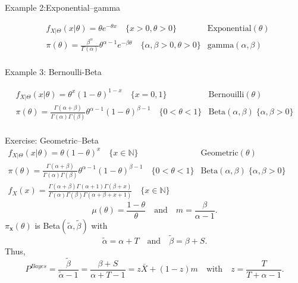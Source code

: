 \documentclass[11pt]{beamer}
\begin{document}
\begin{frame}{Example 2:Exponential--gamma}
\vspace{-3 cm}

\begin{align*}
&f_{X|\Theta}(x|\theta)=\theta e^{-\theta x} \quad\{x>0, \theta>0\} & \text{Exponential}(\theta) \\
&\pi(\theta)=\frac{\beta^\alpha}{\Gamma(\alpha)}\theta^{\alpha-1}e^{-\beta \theta} \quad\{\alpha,\beta>0,\theta>0\}& \text{gamma}(\alpha,\beta) \\
\end{align*}


\end{frame}
\begin{frame}

\end{frame}
\begin{frame}

\end{frame}
\begin{frame}{Example 3: Bernoulli-Beta}
\vspace{-3 cm}

\begin{align*}
f_{X|\Theta}(x|\theta)=\theta^x(1-\theta)^{1-x} \quad\{x=0,1\} & \text{Bernouilli}(\theta) \\
\pi(\theta)=\frac{\Gamma(\alpha+\beta)}{\Gamma(\alpha)\Gamma(\beta)}\theta^{\alpha-1}(1-\theta)^{\beta-1} \quad\{0<\theta<1\} & \text{Beta}(\alpha,\beta) \;\{\alpha,\beta>0\}\\
\end{align*}


\end{frame}
\begin{frame}[t]{Exercise: Geometric--Beta}
\renewcommand{\arraystretch}{1.5}$
\begin{array}{ll}
f_{X|\Theta}(x|\theta)=\theta(1-\theta)^{x} \quad\{x\in\mathbb{N}\} & \text{Geometric}(\theta) \\
\pi(\theta)=\frac{\Gamma(\alpha+\beta)}{\Gamma(\alpha)\Gamma(\beta)}\theta^{\alpha-1}(1-\theta)^{\beta-1} \quad\{0<\theta<1\} & \text{Beta}(\alpha,\beta) \;\{\alpha,\beta>0\}\\
f_X(x)=\frac{\Gamma(\alpha+\beta)\Gamma(\alpha+1)\Gamma(\beta+x)}{\Gamma(\alpha)\Gamma(\beta)\Gamma(\alpha+\beta+x+1)} \quad\{x\in\mathbb{N}\}
\end{array}$
$$\mu(\theta)=\frac{1-\theta}{\theta} \quad\text{and}\quad m=\frac{\beta}{\alpha-1}.$$
$\pi_\mathbf{x}(\theta)$ is Beta$(\widetilde{\alpha},\widetilde{\beta})$ with
$$\widetilde{\alpha}=\alpha + T \quad\text{and}\quad \widetilde{\beta}=\beta + S. $$
Thus,
$$P^{Bayes}=\frac{\widetilde{\beta}}{\widetilde{\alpha}-1}=\frac{\beta+S}{\alpha+T-1} =z\bar{X}+(1-z)m \quad\text{with}\quad z=\frac{T}{T+\alpha-1}. $$
\end{frame}
\end{document}
